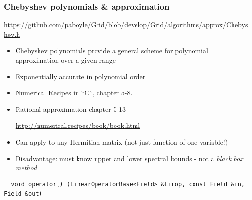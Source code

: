 \documentclass[pdf,ps,8pt]{beamer}
\newcommand{\link}[1]{\href{#1}{ {\color{blue} #1} }}
\begin{document}
  \begin{frame}[fragile]\small\frametitle{ Chebyshev polynomials \& approximation}

    \begin{center}
    \link{https://github.com/paboyle/Grid/blob/develop/Grid/algorithms/approx/Chebyshev.h}
    \end{center}

    \begin{itemize}
    \item Chebyshev polynomials provide a general scheme for polynomial approximation over a given range
    \item Exponentially accurate in polynomial order
    \item Numerical Recipes in ``C'', chapter 5-8.
    \item Rational approximation chapter 5-13
\begin{center}    \link{http://numerical.recipes/book/book.html}\end{center}
    \item Can apply to any Hermitian matrix (not just function of one variable!)
    \item Disadvantage: must know upper and lower spectral bounds - not a \emph{black box method}
    \end{itemize}

         {\tiny
\begin{verbatim}
  void operator() (LinearOperatorBase<Field> &Linop, const Field &in, Field &out) 
\end{verbatim}
}

  \end{frame}
\end{document}
